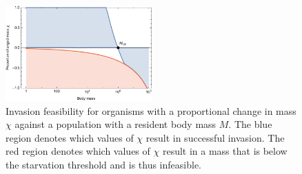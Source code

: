\documentclass{pnastwo}
\begin{document}
\begin{figure}
\centering
\includegraphics[width=0.5\textwidth]{fig_Invasion.pdf}
\caption{
Invasion feasibility for organisms with a proportional change in mass $\chi$ against a population with a resident body mass $M$.
The blue region denotes which values of $\chi$ result in successful invasion.
The red region denotes which values of $\chi$ result in a mass that is below the starvation threshold and is thus infeasible.
}
\label{fig:invasion}
\end{figure}  
 

% 
% 
%	 
%
%
%
%
%	 
% 
%	
%
\clearpage
\end{document}
